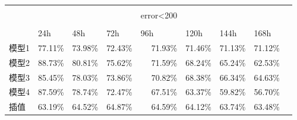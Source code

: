 \begin{table}[htbp]
\begin{tabular}{rrrrrrrrr}
     \hline
          &       &       &       &       &       &       &       &  \\
          &       &       &       &\multicolumn{1}{l}{error<200} &       &       &       &  \\ \\
          \hline
          & \multicolumn{1}{l}{24h} & \multicolumn{1}{l}{48h} & \multicolumn{1}{l}{72h} & \multicolumn{1}{l}{96h} & \multicolumn{1}{l}{120h} & \multicolumn{1}{l}{144h} & \multicolumn{1}{l}{168h} &  \\
          \hline
    \multicolumn{1}{l}{模型1} & 77.11\% & 73.98\% & 72.43\% & 71.93\% & 71.46\% & 71.13\% & 71.12\% &  \\
    \multicolumn{1}{l}{模型2} & 88.73\% & 80.81\% & 75.62\% & 71.59\% & 68.24\% & 65.24\% & 62.53\% &  \\
    \multicolumn{1}{l}{模型3} & 85.45\% & 78.03\% & 73.86\% & 70.82\% & 68.38\% & 66.34\% & 64.63\% &  \\
    \multicolumn{1}{l}{模型4} & 87.59\% & 78.74\% & 72.47\% & 67.51\% & 63.37\% & 59.82\% & 56.70\% &  \\
    \multicolumn{1}{l}{插值} & 63.19\% & 64.52\% & 64.87\% & 64.59\% & 64.12\% & 63.74\% & 63.48\% &  \\
    \hline
    \end{tabular}%
  \label{tab:diffpara}%
\end{table}%



